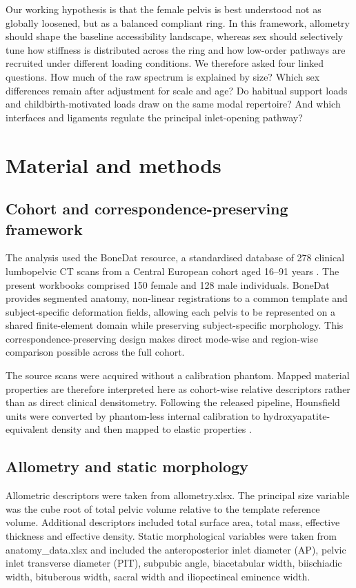 \documentclass[openacc]{rsproca_new}
\begin{document}
Our working hypothesis is that the female pelvis is best understood not as globally loosened, but as a balanced compliant ring. In this framework, allometry should shape the baseline accessibility landscape, whereas sex should selectively tune how stiffness is distributed across the ring and how low-order pathways are recruited under different loading conditions. We therefore asked four linked questions. How much of the raw spectrum is explained by size? Which sex differences remain after adjustment for scale and age? Do habitual support loads and childbirth-motivated loads draw on the same modal repertoire? And which interfaces and ligaments regulate the principal inlet-opening pathway?

\section{Material and methods}
\subsection{Cohort and correspondence-preserving framework}
The analysis used the BoneDat resource, a standardised database of 278 clinical lumbopelvic CT scans from a Central European cohort aged 16--91 years \cite{hen2025}. The present workbooks comprised 150 female and 128 male individuals. BoneDat provides segmented anatomy, non-linear registrations to a common template and subject-specific deformation fields, allowing each pelvis to be represented on a shared finite-element domain while preserving subject-specific morphology. This correspondence-preserving design makes direct mode-wise and region-wise comparison possible across the full cohort.

The source scans were acquired without a calibration phantom. Mapped material properties are therefore interpreted here as cohort-wise relative descriptors rather than as direct clinical densitometry. Following the released pipeline, Hounsfield units were converted by phantom-less internal calibration to hydroxyapatite-equivalent density and then mapped to elastic properties \cite{hen2025}.

\subsection{Allometry and static morphology}
Allometric descriptors were taken from allometry.xlsx. The principal size variable was the cube root of total pelvic volume relative to the template reference volume. Additional descriptors included total surface area, total mass, effective thickness and effective density. Static morphological variables were taken from anatomy\_data.xlsx and included the anteroposterior inlet diameter (AP), pelvic inlet transverse diameter (PIT), subpubic angle, biacetabular width, biischiadic width, bituberous width, sacral width and iliopectineal eminence width.
\end{document}
